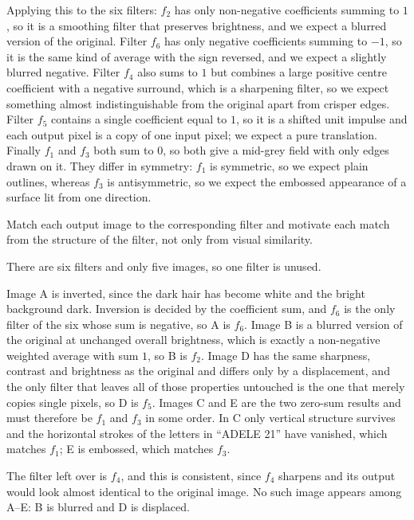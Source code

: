 \documentclass[11pt]{article}
\begin{document}
Applying this to the six filters: $f_2$ has only non-negative coefficients
summing to $1$, so it is a smoothing filter that preserves brightness, and we
expect a blurred version of the original. Filter $f_6$ has only negative
coefficients summing to $-1$, so it is the same kind of average with the sign
reversed, and we expect a slightly blurred negative. Filter $f_4$ also sums to
$1$ but combines a large positive centre coefficient with a negative surround,
which is a sharpening filter, so we expect something almost indistinguishable
from the original apart from crisper edges. Filter $f_5$ contains a single
coefficient equal to $1$, so it is a shifted unit impulse and each output
pixel is a copy of one input pixel; we expect a pure translation. Finally
$f_1$ and $f_3$ both sum to $0$, so both give a mid-grey field with only
edges drawn on it. They differ in symmetry: $f_1$ is symmetric, so we expect
plain outlines, whereas $f_3$ is antisymmetric, so we expect the embossed
appearance of a surface lit from one direction.

\begin{question}
Match each output image to the corresponding filter and motivate each match
from the structure of the filter, not only from visual similarity.
\end{question}

There are six filters and only five images, so one filter is unused.

Image A is inverted, since the dark hair has become white and the bright
background dark. Inversion is decided by the coefficient sum, and $f_6$ is the
only filter of the six whose sum is negative, so A is $f_6$. Image B is a
blurred version of the original at unchanged overall brightness, which is
exactly a non-negative weighted average with sum $1$, so B is $f_2$. Image D
has the same sharpness, contrast and brightness as the original and differs
only by a displacement, and the only filter that leaves all of those
properties untouched is the one that merely copies single pixels, so D is
$f_5$. Images C and E are the two zero-sum results and must therefore be $f_1$
and $f_3$ in some order. In C only vertical structure survives and the
horizontal strokes of the letters in ``ADELE 21'' have vanished, which matches
$f_1$; E is embossed, which matches $f_3$.

The filter left over is $f_4$, and this is consistent, since $f_4$ sharpens
and its output would look almost identical to the original image. No such
image appears among A--E: B is blurred and D is displaced.
\end{document}

